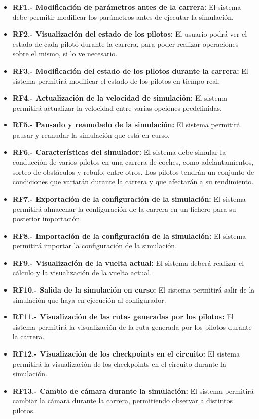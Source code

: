 \begin{itemize}
    \item \textbf{RF1.- Modificación de parámetros antes de la carrera:} El sistema debe permitir modificar los parámetros antes de ejecutar la simulación.
    \item \textbf{RF2.- Visualización del estado de los pilotos:} El usuario podrá ver el estado de cada piloto durante la carrera, para poder realizar operaciones sobre el mismo, si lo ve necesario.
    \item \textbf{RF3.- Modificación del estado de los pilotos durante la carrera:} El sistema permitirá modificar el estado de los pilotos en tiempo real.
    \item \textbf{RF4.- Actualización de la velocidad de simulación:} El sistema permitirá actualizar la velocidad entre varias opciones predefinidas.
    \item \textbf{RF5.- Pausado y reanudado de la simulación:} El sistema permitirá pausar y reanudar la simulación que está en curso.
    \item \textbf{RF6.- Características del simulador:} El sistema debe simular la conducción de varios pilotos en una carrera de coches, como adelantamientos, sorteo de obstáculos y rebufo, entre otros. Los pilotos tendrán un conjunto de condiciones que variarán durante la carrera y que afectarán a su rendimiento.
    \item \textbf{RF7.- Exportación de la configuración de la simulación:} El sistema permitirá almacenar la configuración de la carrera en un fichero para su posterior importación.
    \item \textbf{RF8.- Importación de la configuración de la simulación:} El sistema permitirá importar la configuración de la simulación.
    \item \textbf{RF9.- Visualización de la vuelta actual:} El sistema deberá realizar el cálculo y la visualización de la vuelta actual.
    \item \textbf{RF10.- Salida de la simulación en curso: }El sistema permitirá salir de la simulación que haya en ejecución al configurador.
    \item \textbf{RF11.- Visualización de las rutas generadas por los pilotos: }El sistema permitirá la visualización de la ruta generada por los pilotos durante la carrera.
    \item \textbf{RF12.- Visualización de los checkpoints en el circuito: }El sistema permitirá la visualización de los checkpoints en el circuito durante la simulación.
    \item \textbf{RF13.- Cambio de cámara durante la simulación: }El sistema permitirá cambiar la cámara durante la carrera, permitiendo observar a distintos pilotos.
\end{itemize}



